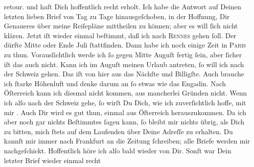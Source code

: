 \begin{ledgroupsized}[t]{13cm}
{{{                  retour.}}}\label{K_L02878-1h} und haſt Dich hoffentlich recht erholt. Ich habe die Antwort auf
               Deinen letzten lieben Brief von Tag zu Tage hinausgeſchoben, in der Hoffnung, Dir
               Genaueres über meine Reiſepläne mittheilen zu können; aber es will ſich nicht klären.
               Jetzt iſt wieder einmal beſtimmt, daß ich nach \textsc{Rennes} gehen ſoll. Der \label{K_L02878-2v}\label{K_L02878-2h} dürfte Mitte oder Ende Juli ſtattfinden. Dann habe ich noch einige Zeit in \textsc{Paris} zu thun. Vorausſichtlich werde ich ſo gegen Mitte Auguſt fertig ſein, aber ſicher iſt das auch nicht. {\pb}Kann ich im Auguſt
               meinen Urlaub antreten, ſo will ich nach der Schweiz gehen. Das iſt von hier aus das Nächſte und Billigſte. Auch brauche
               ich ſtarke Höhenluft und denke darum an ſo etwas wie das Engadin. Nach Öſterreich
               kann ich diesmal nicht kommen, aus mancherlei Gründen nicht. Wenn ich alſo nach der
                  Schweiz gehe, ſo wirſt Du Dich, wie ich
               zuverſichtlich hoffe, mit mir \label{K_L02878-3v}\label{K_L02878-3h}.
               Auch Dir wird es gut thun, einmal aus Öſterreich herauszukommen. Da ich aber noch gar nichts Beſtimmtes ſagen
               kann, ſo bleibt mir nichts übrig, als Dich zu bitten, mich ſtets auf dem Laufenden
               über Deine Adreſſe zu erhalten. Du kannſt mir immer nach Frankfurt an die Zeitung ſchreiben; alle Briefe werden mir nachgeſchickt. {\pb}Hoffentlich höre ich alſo bald wieder von Dir.\pend
           \pstart
           Sonſt war Dein letzter Brief  wieder einmal recht

\end{ledgroupsized}
